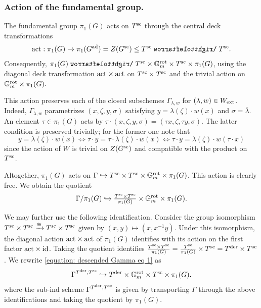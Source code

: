\subsubsection{Action of the fundamental group.}\label{section: action of the fundamental group}
The fundamental group $\pi_1(G)$ acts on $T^{\sc}$ through the central deck transformations
\begin{equation*}
    \act: \pi_1(G) \to \pi_1(G^{\ad}) = Z(G^{\sc}) \leq T^{\sc} \acts T^{\sc}.
\end{equation*}
Consequently, $\pi_1(G) \acts T^{\sc} \times \Gm^{\rot} \times T^{\sc} \times \pi_1(G)$, using the diagonal deck transformation $\act \times \act$ on $T^{\sc} \times T^{\sc}$ and the trivial action on $\Gm^{\rot} \times \pi_1(G)$. 

This action preserves each of the closed subschemes $\Gamma_{\lambda, w}$ for $(\lambda, w) \in W_{\ext}$. Indeed, $\Gamma_{\lambda, w}$ parametrizes $(x, \zeta, y, \sigma)$ satisfying $y = \lambda(\zeta) \cdot w(x)$ and $\sigma = \overline{\lambda}$. An element $\tau \in \pi_1(G)$ acts by $\tau \cdot (x, \zeta, y, \sigma) = (\tau x, \zeta, \tau y, \sigma)$. The latter condition is preserved trivially; for the former one note that
\begin{equation*}
    y = \lambda(\zeta) \cdot w(x) 
    \iff \tau \cdot y = \tau \cdot \lambda(\zeta) \cdot w(x) 
    \iff  \tau \cdot y = \lambda(\zeta) \cdot w(\tau \cdot x)
\end{equation*}
since the action of $W$ is trivial on $Z(G^{\sc})$ and compatible with the product on $T^{\sc}$. 

Altogether, $\pi_1(G)$ acts on $\Gamma \hookrightarrow T^{\sc} \times T^{\sc} \times \Gm^{\rot} \times \pi_1(G)$. This action is clearly free. We obtain the quotient
\begin{equation}\label{equation: descended Gamma eq 1}
    \Gamma / \pi_1(G) \hookrightarrow \tfrac{T^{\sc} \times T^{\sc}}{\pi_1(G)} \times \Gm^{\rot} \times \pi_1(G). 
\end{equation}

\begin{remark}\label{remark: identification for Gamma in semisimple case}
We may further use the following identification. Consider the group isomorphism $T^{\sc} \times T^{\sc} \xrightarrow{\cong} T^{\sc} \times T^{\sc}$ given by $(x, y) \mapsto (x, x^{-1}y)$. Under this isomorphism, the diagonal action $\act \times \act$ of $\pi_1(G)$ identifies with its action on the first factor $\act \times \id$. Taking the quotient identifies $\tfrac{T^{\sc} \times T^{\sc}}{\pi_1(G)} = \tfrac{T^{\sc}}{\pi_1(G)} \times T^{\sc} = T^{\der} \times T^{\sc}$. We rewrite \eqref{equation: descended Gamma eq 1} as
\begin{equation}\label{equation: descended Gamma eq 2}
    \Gamma^{T^{\der}, T^{\sc}} \hookrightarrow T^{\der} \times \Gm^{\rot} \times T^{\sc} \times \pi_1(G). 
\end{equation}
where the sub-ind scheme $\Gamma^{T^{\der}, T^{\sc}}$ is given by transporting $\Gamma$ through the above identifications and taking the quotient by $\pi_1(G)$.
\end{remark}

